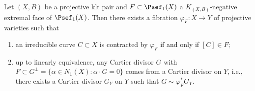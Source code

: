     \begin{theorem}\label{thm: contraction theorem}
        Let \((X,B)\) be a projective klt pair and \(F \subset \Psef_1(X)\) a \(K_{(X,B)}\)-negative extremal face of \(\Psef_1(X)\).
        Then there exists a fibration \(\varphi_F: X \to Y\) of projective varieties such that
        \begin{enumerate}
            \item an irreducible curve \(C \subset X\) is contracted by \(\varphi_F\) if and only if \([C] \in F\);
            \item up to linearly equivalence, any Cartier divisor \(G\) with \(F \subset G^{\perp} = \{\alpha \in N_1(X) : \alpha \cdot G= 0\}\) comes from a Cartier divisor on \(Y\), 
                i.e., there exists a Cartier divisor \(G_Y\) on \(Y\) such that \(G \sim \varphi_F^* G_Y\).
        \end{enumerate}
    \end{theorem}
